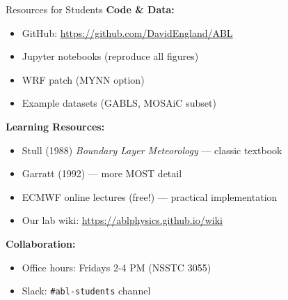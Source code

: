 \documentclass[10pt,aspectratio=169]{beamer}
\begin{document}
\begin{frame}{Resources for Students}
  \textbf{Code \& Data:}
  \begin{itemize}
    \item GitHub: \url{https://github.com/DavidEngland/ABL}
    \item Jupyter notebooks (reproduce all figures)
    \item WRF patch (MYNN option)
    \item Example datasets (GABLS, MOSAiC subset)
  \end{itemize}
  
  \vspace{0.3cm}
  \textbf{Learning Resources:}
  \begin{itemize}
    \item Stull (1988) \textit{Boundary Layer Meteorology} — classic textbook
    \item Garratt (1992) — more MOST detail
    \item ECMWF online lectures (free!) — practical implementation
    \item Our lab wiki: \url{https://ablphysics.github.io/wiki}
  \end{itemize}
  
  \vspace{0.3cm}
  \textbf{Collaboration:}
  \begin{itemize}
    \item Office hours: Fridays 2-4 PM (NSSTC 3055)
    \item Slack: \texttt{\#abl-students} channel
  \end{itemize}
\end{frame}
\end{document}
